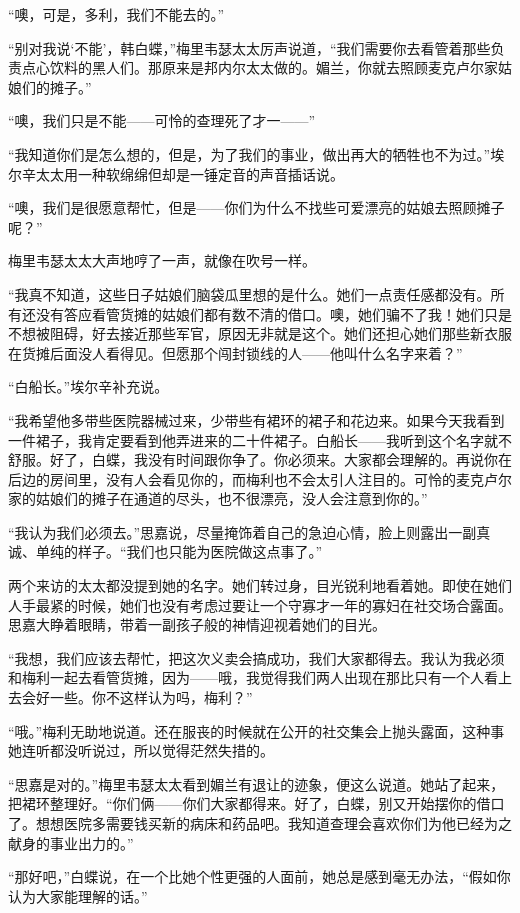 \par “噢，可是，多利，我们不能去的。”
\par “别对我说‘不能’，韩白蝶，”梅里韦瑟太太厉声说道，“我们需要你去看管着那些负责点心饮料的黑人们。那原来是邦内尔太太做的。媚兰，你就去照顾麦克卢尔家姑娘们的摊子。”
\par “噢，我们只是不能——可怜的查理死了才一——”
\par “我知道你们是怎么想的，但是，为了我们的事业，做出再大的牺牲也不为过。”埃尔辛太太用一种软绵绵但却是一锤定音的声音插话说。
\par “噢，我们是很愿意帮忙，但是——你们为什么不找些可爱漂亮的姑娘去照顾摊子呢？”
\par 梅里韦瑟太太大声地哼了一声，就像在吹号一样。
\par “我真不知道，这些日子姑娘们脑袋瓜里想的是什么。她们一点责任感都没有。所有还没有答应看管货摊的姑娘们都有数不清的借口。噢，她们骗不了我！她们只是不想被阻碍，好去接近那些军官，原因无非就是这个。她们还担心她们那些新衣服在货摊后面没人看得见。但愿那个闯封锁线的人——他叫什么名字来着？”
\par “白船长。”埃尔辛补充说。
\par “我希望他多带些医院器械过来，少带些有裙环的裙子和花边来。如果今天我看到一件裙子，我肯定要看到他弄进来的二十件裙子。白船长——我听到这个名字就不舒服。好了，白蝶，我没有时间跟你争了。你必须来。大家都会理解的。再说你在后边的房间里，没有人会看见你的，而梅利也不会太引人注目的。可怜的麦克卢尔家的姑娘们的摊子在通道的尽头，也不很漂亮，没人会注意到你的。”
\par “我认为我们必须去。”思嘉说，尽量掩饰着自己的急迫心情，脸上则露出一副真诚、单纯的样子。“我们也只能为医院做这点事了。”
\par 两个来访的太太都没提到她的名字。她们转过身，目光锐利地看着她。即使在她们人手最紧的时候，她们也没有考虑过要让一个守寡才一年的寡妇在社交场合露面。思嘉大睁着眼睛，带着一副孩子般的神情迎视着她们的目光。
\par “我想，我们应该去帮忙，把这次义卖会搞成功，我们大家都得去。我认为我必须和梅利一起去看管货摊，因为——哦，我觉得我们两人出现在那比只有一个人看上去会好一些。你不这样认为吗，梅利？”
\par “哦。”梅利无助地说道。还在服丧的时候就在公开的社交集会上抛头露面，这种事她连听都没听说过，所以觉得茫然失措的。
\par “思嘉是对的。”梅里韦瑟太太看到媚兰有退让的迹象，便这么说道。她站了起来，把裙环整理好。“你们俩——你们大家都得来。好了，白蝶，别又开始摆你的借口了。想想医院多需要钱买新的病床和药品吧。我知道查理会喜欢你们为他已经为之献身的事业出力的。”
\par “那好吧，”白蝶说，在一个比她个性更强的人面前，她总是感到毫无办法，“假如你认为大家能理解的话。”
